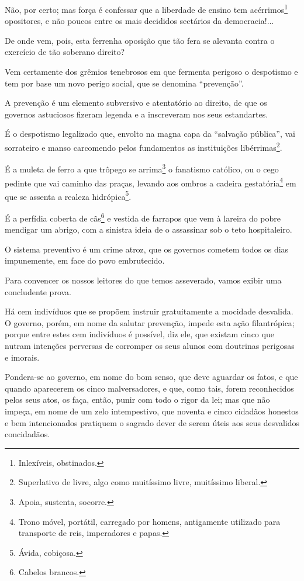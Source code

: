 Não, por certo; mas força é confessar que a liberdade de ensino tem
acérrimos\footnote{Inlexíveis, obstinados.} opositores, e não poucos
entre os mais decididos sectários da democracia!...

De onde vem, pois, esta ferrenha oposição que tão fera se alevanta
contra o exercício de tão soberano direito?

Vem certamente dos grêmios tenebrosos em que fermenta perigoso o
despotismo e tem por base um novo perigo social, que se denomina
``prevenção''.

A prevenção é um elemento subversivo e atentatório ao direito, de que os
governos astuciosos fizeram legenda e a inscreveram nos seus
estandartes.

É o despotismo legalizado que, envolto na magna capa da ``salvação
pública'', vai sorrateiro e manso carcomendo pelos fundamentos as
instituições libérrimas\footnote{Superlativo de livre, algo como
  muitíssimo livre, muitíssimo liberal.}.

É a muleta de ferro a que trôpego se arrima\footnote{Apoia, sustenta,
  socorre.} o fanatismo católico, ou o cego pedinte que vai caminho das
praças, levando aos ombros a cadeira gestatória\footnote{Trono móvel,
  portátil, carregado por homens, antigamente utilizado para transporte
  de reis, imperadores e papas.} em que se assenta a realeza
hidrópica\footnote{Ávida, cobiçosa.}.

É a perfídia coberta de cãs\footnote{Cabelos brancos.} e vestida de
farrapos que vem à lareira do pobre mendigar um abrigo, com a sinistra
ideia de o assassinar sob o teto hospitaleiro.

O sistema preventivo é um crime atroz, que os governos cometem todos os
dias impunemente, em face do povo embrutecido.

Para convencer os nossos leitores do que temos asseverado, vamos exibir
uma concludente prova.

Há cem indivíduos que se propõem instruir gratuitamente a mocidade
desvalida. O governo, porém, em nome da salutar prevenção, impede esta
ação filantrópica; porque entre estes cem indivíduos é possível, diz
ele, que existam cinco que nutram intenções perversas de corromper os
seus alunos com doutrinas perigosas e imorais.

Pondera-se ao governo, em nome do bom senso, que deve aguardar os fatos,
e que quando aparecerem os cinco malversadores, e que, como tais, forem
reconhecidos pelos seus atos, os faça, então, punir com todo o rigor da
lei; mas que não impeça, em nome de um zelo intempestivo, que noventa e
cinco cidadãos honestos e bem intencionados pratiquem o sagrado dever de
serem úteis aos seus desvalidos concidadãos.

